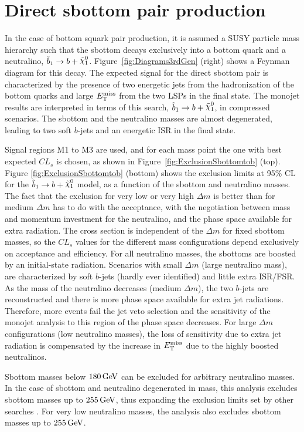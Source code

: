 \section{Direct sbottom pair production}
    \label{sec:DirectSbottomProduction}

In the case of bottom squark pair production, it is assumed a SUSY particle mass hierarchy such that the sbottom decays exclusively into a bottom quark and a neutralino, $\sbottomtob$.
Figure~\ref{fig:Diagrams3rdGen} (right) shows a Feynman diagram for this decay.
The expected signal for the direct sbottom pair is characterized by the presence of two energetic jets from the hadronization of the bottom quarks and large $E_{\mathrm{T}}^{\mathrm{miss}}$ from the two LSPs in the final state.
The monojet results are interpreted in terms of this search, $\sbottomtob$, in compressed scenarios.
The sbottom and the neutralino masses are almost degenerated, leading to two soft $b$-jets and an energetic ISR in the final state.

Signal regions M1 to M3 are used, and for each mass point the one with best expected $CL_s$ is chosen, as shown in Figure~\ref{fig:ExclusionSbottomtob} (top).
Figure \ref{fig:ExclusionSbottomtob} (bottom) shows the exclusion limits at 95\% CL for the $\sbottomtob$ model, as a function of the sbottom and neutralino masses.
The fact that the exclusion for very low or very high $\Delta m$ is better than for medium $\Delta m$ has to do with the acceptance, with the negotiation between mass and momentum investment for the neutralino, and the phase space available for extra radiation.
The cross section is independent of the $\Delta m$ for fixed sbottom masses, so the $CL_s$ values for the different mass configurations depend exclusively on acceptance and efficiency.
For all neutralino masses, the sbottoms are boosted by an initial-state radiation.
Scenarios with small $\Delta m$ (large neutralino mass), are characterized by soft $b$-jets (hardly ever identified) and little extra ISR/FSR.
As the mass of the neutralino decreases (medium $\Delta m$), the two $b$-jets are reconstructed and there is more phase space available for extra jet radiations.
Therefore, more events fail the jet veto selection and the sensitivity of the monojet analysis to this region of the phase space decreases.
For large $\Delta m$ configurations (low neutralino masses), the loss of sensitivity due to extra jet radiation is compensated by the increase in $E_{\mathrm{T}}^{\mathrm{miss}}$ due to the highly boosted neutralinos.

Sbottom masses below $\unit[180]{GeV}$ can be excluded for arbitrary neutralino masses.
In the case of sbottom and neutralino degenerated in mass, this analysis excludes sbottom masses up to $\unit[255]{GeV}$, thus expanding the exclusion limits set by other searches \cite{Aaltonen:2010dy,Abazov:2010wq,Aad:2013ija}.
For very low neutralino masses, the analysis also excludes sbottom masses up to $\unit[255]{GeV}$.


